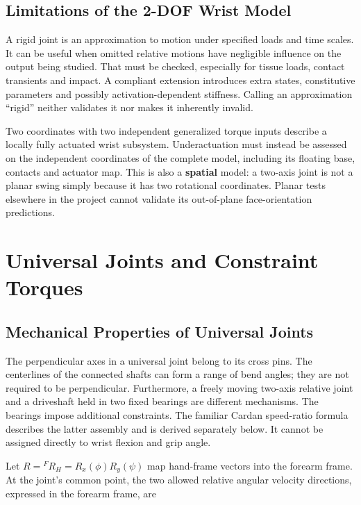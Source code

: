 \documentclass[
  11pt,
]{article}
\begin{document}
\subsection{Limitations of the 2-DOF Wrist
Model}\label{limitations-of-the-2-dof-wrist-model}

A rigid joint is an approximation to motion under specified loads and
time scales. It can be useful when omitted relative motions have
negligible influence on the output being studied. That must be checked,
especially for tissue loads, contact transients and impact. A compliant
extension introduces extra states, constitutive parameters and possibly
activation-dependent stiffness. Calling an approximation ``rigid''
neither validates it nor makes it inherently invalid.

Two coordinates with two independent generalized torque inputs describe
a locally fully actuated wrist subsystem. Underactuation must instead be
assessed on the independent coordinates of the complete model, including
its floating base, contacts and actuator map. This is also a
\textbf{spatial} model: a two-axis joint is not a planar swing simply
because it has two rotational coordinates. Planar tests elsewhere in the
project cannot validate its out-of-plane face-orientation predictions.

\section{Universal Joints and Constraint
Torques}\label{universal-joints-and-constraint-torques}

\subsection{Mechanical Properties of Universal
Joints}\label{mechanical-properties-of-universal-joints}

The perpendicular axes in a universal joint belong to its cross pins.
The centerlines of the connected shafts can form a range of bend angles;
they are not required to be perpendicular. Furthermore, a freely moving
two-axis relative joint and a driveshaft held in two fixed bearings are
different mechanisms. The bearings impose additional constraints. The
familiar Cardan speed-ratio formula describes the latter assembly and is
derived separately below. It cannot be assigned directly to wrist
flexion and grip angle.

Let \(R={}^{F}R_H=R_x(\phi)R_y(\psi)\) map hand-frame vectors into the
forearm frame. At the joint's common point, the two allowed relative
angular velocity directions, expressed in the forearm frame, are
\end{document}
